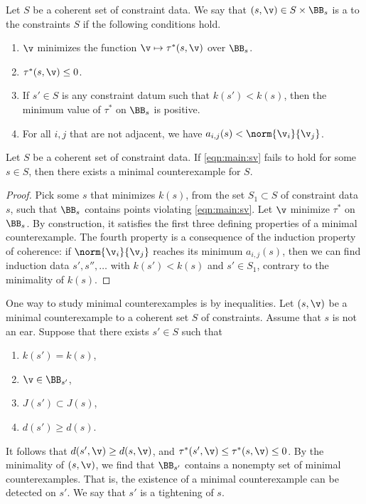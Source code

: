 \begin{definition}
  Let $S$ be a coherent set of constraint data.  We say that
  $(s,\v)\in S\times\BB_s$ is a  to
  the constraints $S$ if the following conditions hold.
\begin{enumerate}
\item $\v$ minimizes the function $\v\mapsto\tau^*(s,\v)$ over $\BB_s$.
\item  $\tau^*(s,\v)\le 0$.
\item If $s'\in S$ is any constraint datum such that $k(s')<k(s)$, then the
minimum value of $\tau^*$ on $\BB_s$ is positive.
\item For all $i,j$ that are not adjacent, we have $a_{i,j}(s) < \norm{\v_i}{\v_j}$.
\end{enumerate}
\end{definition}

\begin{lemma}
Let $S$ be a coherent set of constraint data.
If \eqref{eqn:main:sv} fails to hold for some $s\in S$, 
then there exists a minimal counterexample for $S$.
\end{lemma}

\begin{proof}
  Pick some $s$ that minimizes $k(s)$, from the set $S_1\subset S$ of
  constraint data $s$, such that $\BB_s$ contains points violating
  \eqref{eqn:main:sv}.  Let $\v$ minimize $\tau^*$ on $\BB_s$.  By
  construction, it satisfies the first three defining properties of a
  minimal counterexample.  The fourth property is a consequence of the
  induction property of coherence: if $\norm{\v_i}{\v_j}$ reaches its
  minimum $a_{i,j}(s)$, then we can find induction data
  $s',s'',\ldots$ with $k(s')<k(s)$ and $s'\in S_1$, contrary to the
  minimality of $k(s)$.
\end{proof}

\begin{remark}  
  One way to study minimal counterexamples is by
   inequalities.  Let $(s,\v)$ be a minimal
  counterexample to a coherent set $S$ of constraints.  Assume that
  $s$ is not an ear.  Suppose that there exists $s'\in S$ such that
\begin{enumerate}
\item $k(s')=k(s)$, 
\item $\v\in \BB_{s'}$, 
\item $J(s')\subset J(s)$,
\item $d(s')\ge d(s)$.
\end{enumerate}
It follows that $d(s',\v)\ge d(s,\v)$, and $\tau^*(s',\v)\le \tau^*(s,\v)\le0$.
By the minimality of $(s,\v)$, we find that $\BB_{s'}$ contains
a nonempty set of minimal counterexamples. 
That is, the existence of a minimal counterexample can be detected on $s'$.
We say that $s'$ is a tightening
of $s$.  
\end{remark}

